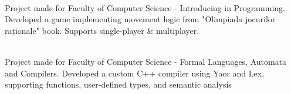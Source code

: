 \documentclass[a4paper]{MagicalCV}
\begin{document}
\begin{minipage}[t]{0.59\textwidth}

 \\
Project made for Faculty of Computer Science - Introducing in Programming. Developed a game implementing movement logic from "Olimpiada jocurilor raționale" book. Supports single-player \& multiplayer.
\sectionsep

 \\
Project made for Faculty of Computer Science - Formal Languages, Automata and Compilers.
Developed a custom C++ compiler using Yacc and Lex, supporting functions, user-defined types, and semantic analysis
\sectionsep

\end{minipage} 
\end{document}

